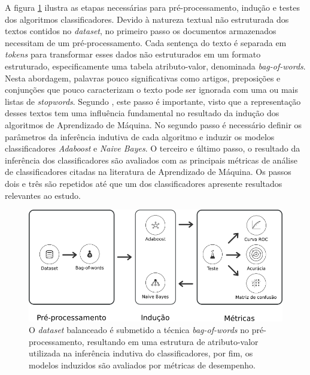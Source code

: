 A figura \ref{figure:metodologia_3} ilustra as etapas necessárias para 
pré-processamento, indução e testes dos algoritmos classificadores. Devido à 
natureza textual não estruturada dos textos contidos no \textit{dataset}, no 
primeiro passo os documentos armazenados necessitam de um pré-processamento. 
Cada sentença do texto é separada em \textit{tokens} para transformar esses 
dados não estruturados em um formato estruturado, especificamente uma tabela 
atributo-valor, denominada \textit{bag-of-words}. Nesta abordagem, palavras 
pouco significativas como artigos, preposições e conjunções que pouco 
caracterizam o texto pode ser ignorada com uma ou mais listas de 
\textit{stopwords}. Segundo , este passo é 
importante, visto que a representação desses textos tem uma influência 
fundamental no resultado da indução dos algoritmos de Aprendizado de Máquina. 
No segundo passo é necessário definir os parâmetros da inferência indutiva de 
cada algoritmo e induzir os modelos classificadores \textit{Adaboost} e 
\textit{Naive Bayes}. O terceiro e último passo, o resultado da inferência dos 
classificadores são avaliados com as principais métricas de análise de 
classificadores citadas na literatura de Aprendizado de Máquina. Os passos dois 
e três são repetidos até que um dos classificadores apresente resultados 
relevantes ao estudo.

\begin{figure}[H]
\begin{center}
    \includegraphics[scale=0.60]{images/metodologia_3.png}
\end{center}
\caption{O \textit{dataset} balanceado é submetido a técnica 
\textit{bag-of-words} no pré-processamento, resultando em uma estrutura de 
atributo-valor utilizada na inferência indutiva do classificadores, por fim, os 
modelos induzidos são avaliados por métricas de desempenho.}
\label{figure:metodologia_3}
\end{figure}

